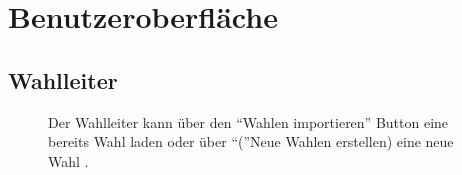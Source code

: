 \documentclass[parskip=full,11pt,twoside]{scrartcl}
\begin{document}
\section{Benutzeroberfläche}

\subsection{Wahlleiter}

\begin{figure}[H]
	\caption{\label{fig:wlltr-start}
		Der \gls{Wahlleiter} kann über den \enquote{Wahlen importieren} Button eine bereits  \gls{Wahl} laden oder über \enquote(Neue Wahlen erstellen) eine neue Wahl . 
	}
\end{figure}
\end{document}
